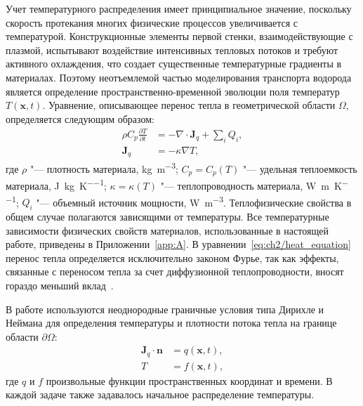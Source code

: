 Учет температурного распределения имеет принципиальное значение, поскольку скорость протекания многих физические процессов увеличивается с температурой. Конструкционные элементы первой стенки, взаимодействующие с плазмой, испытывают воздействие интенсивных тепловых потоков и требуют активного охлаждения, что создает существенные температурные градиенты в материалах. Поэтому неотъемлемой частью моделирования транспорта водорода является определение пространственно-временной эволюции поля температур \( T(\mathbf{x},t) \). Уравнение, описывающее перенос тепла в геометрической области \( \Omega \), определяется следующим образом:
\begin{align}
    \label{eq:ch2/heat_equation}
    \rho C_p \frac{\partial T}{ \partial t} & = -\nabla \cdot \mathbf{J}_q + \sum \limits_i Q_i, \\
    \mathbf{J}_q                            & = -\kappa \nabla T,
\end{align}
где \( \rho \) "--- плотность материала, \si{\kilo\gram\per\meter\cubed}; \( C_p=C_p(T) \) "--- удельная теплоемкость материала, \si{\joule\per\kilo\gram\per\kelvin}; \( \kappa=\kappa(T) \) "--- теплопроводность материала, \si{\watt\per\meter\per\kelvin}; \( Q_i \) "--- объемный источник мощности, \si{\watt\per\meter\cubed}. Теплофизические свойства в общем случае полагаются зависящими от температуры. Все температурные зависимости физических свойств материалов, использованные в настоящей работе, приведены в Приложении~\cref{app:A}. В уравнении~\cref{eq:ch2/heat_equation} перенос тепла определяется исключительно законом Фурье, так как эффекты, связанные с переносом тепла за счет диффузионной теплопроводности, вносят гораздо меньший вклад~\cite{Martinez2021}.

В работе используются неоднородные граничные условия типа Дирихле и Неймана для определения температуры и плотности потока тепла на границе области \( \partial \Omega \):
\begin{subequations}
    \begin{align}
        \mathbf{J}_q \cdot \mathbf{n} & = q(\mathbf{x}, t) \label{eq:ch2/heat_bc_Neumann},  \\
        T                             & = f(\mathbf{x},t) \label{eq:ch2/heat_bc_Dirichlet},
    \end{align}
\end{subequations}
где \(q\) и \(f\) произвольные функции пространственных координат и времени. В каждой задаче также задавалось начальное распределение температуры.

